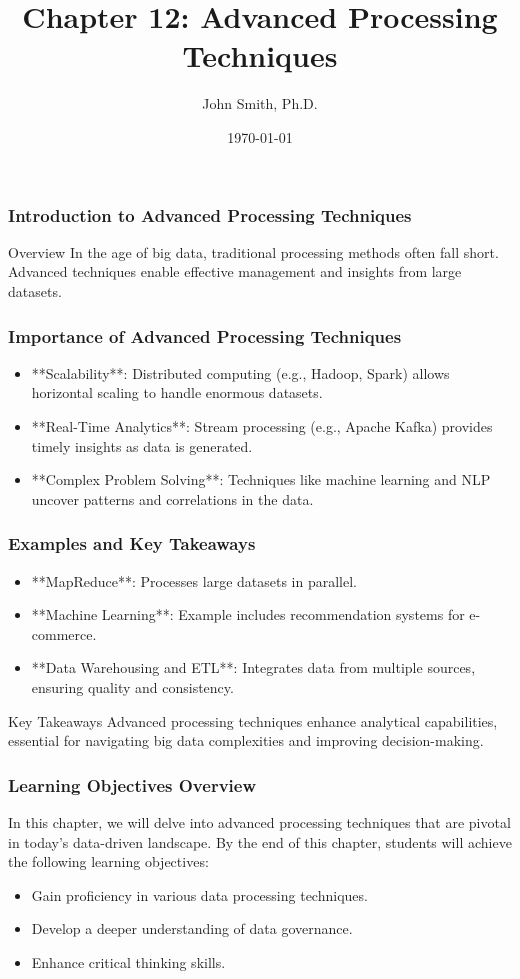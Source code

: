 \documentclass[aspectratio=169]{beamer}
\title[Chapter 12: Advanced Processing Techniques]{Chapter 12: Advanced Processing Techniques}
\author[J. Smith]{John Smith, Ph.D.}
\institute[University Name]{
  Department of Computer Science\\
  University Name\\
  \vspace{0.3cm}
  Email: email@university.edu\\
  Website: www.university.edu
}
\date{\today}
\begin{document}
\frame{\titlepage}

\begin{frame}[fragile]
    \frametitle{Introduction to Advanced Processing Techniques}
    \begin{block}{Overview}
        In the age of big data, traditional processing methods often fall short. Advanced techniques enable effective management and insights from large datasets.
    \end{block}
\end{frame}

\begin{frame}[fragile]
    \frametitle{Importance of Advanced Processing Techniques}
    \begin{itemize}
        \item **Scalability**: Distributed computing (e.g., Hadoop, Spark) allows horizontal scaling to handle enormous datasets.
        \item **Real-Time Analytics**: Stream processing (e.g., Apache Kafka) provides timely insights as data is generated.
        \item **Complex Problem Solving**: Techniques like machine learning and NLP uncover patterns and correlations in the data.
    \end{itemize}
\end{frame}

\begin{frame}[fragile]
    \frametitle{Examples and Key Takeaways}
    \begin{itemize}
        \item **MapReduce**: Processes large datasets in parallel.
        \item **Machine Learning**: Example includes recommendation systems for e-commerce.
        \item **Data Warehousing and ETL**: Integrates data from multiple sources, ensuring quality and consistency.
    \end{itemize}
    \begin{block}{Key Takeaways}
        Advanced processing techniques enhance analytical capabilities, essential for navigating big data complexities and improving decision-making.
    \end{block}
\end{frame}

\begin{frame}[fragile]
    \frametitle{Learning Objectives Overview}
    In this chapter, we will delve into advanced processing techniques that are pivotal in today's data-driven landscape. By the end of this chapter, students will achieve the following learning objectives:
    \begin{itemize}
        \item Gain proficiency in various data processing techniques.
        \item Develop a deeper understanding of data governance.
        \item Enhance critical thinking skills.
    \end{itemize}
\end{frame}
\end{document}
